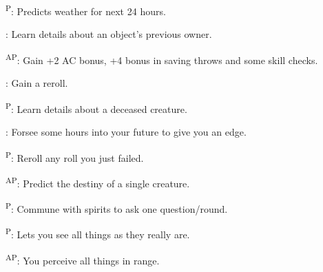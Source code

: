 \begin{enumerate*}
      \textsuperscript{P}: Predicts weather for next 24 hours.

\item {}: Learn details about an object's previous owner.

      \textsuperscript{AP}: Gain +2 AC bonus, +4 bonus in saving throws and some skill checks.

      : Gain a reroll. %

\item {}\textsuperscript{P}: Learn details about a deceased creature.

      : Forsee some hours into your future to give you an edge.

\item {}\textsuperscript{P}: Reroll any roll you just failed. %

      \textsuperscript{AP}: Predict the destiny of a single creature.

\item {}\textsuperscript{P}: Commune with spirits to ask one question/round.

      \textsuperscript{P}: Lets you see all things as they really are.

\item {}\textsuperscript{AP}: You perceive all things in range.
\end{enumerate*}



